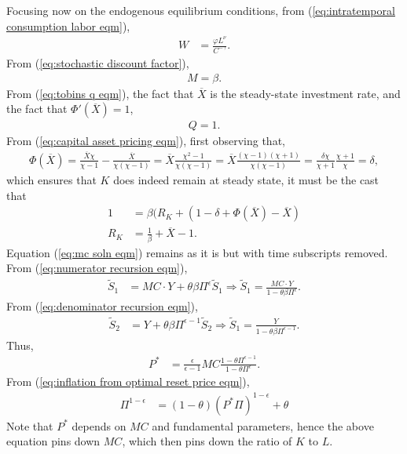 \documentclass[12 pt, oneside]{article}
\theoremstyle{definition}
\theoremstyle{definition}
\theoremstyle{definition}
\begin{document}
Focusing now on the endogenous equilibrium conditions, from (\ref{eq:intratemporal consumption labor eqm}),
\begin{align*}
  W & = \frac{\varphi L^\nu}{C^{-\gamma}}.
\end{align*}
From (\ref{eq:stochastic discount factor}),
\begin{align*}
  M = \beta.
\end{align*}
From (\ref{eq:tobins q eqm}), the fact that $\overline{X}$ is the steady-state investment rate, and the fact that $\Phi'(\overline{X}) = 1$,
\begin{align*}
  Q = 1.
\end{align*}
From (\ref{eq:capital asset pricing eqm}), first observing that,
\begin{align*}
  \Phi(\overline{X}) = \frac{\overline{X}\chi}{\chi - 1} - \frac{\overline{X}}{\chi (\chi - 1)} = \overline{X}\frac{\chi^2 - 1}{\chi(\chi - 1)} = \overline{X}\frac{(\chi - 1)(\chi + 1)}{\chi (\chi - 1)} = \frac{\delta\chi}{\chi + 1}\frac{\chi + 1}{\chi} = \delta,
\end{align*}
which ensures that $K$ does indeed remain at steady state, it must be the cast that
\begin{align*}
  1 & = \beta(R_K + (1 - \delta + \Phi(\overline{X}) - \overline{X})\\
  R_K & = \frac{1}{\beta} + \overline{X} - 1.
\end{align*}
Equation (\ref{eq:mc soln eqm}) remains as it is but with time subscripts removed. From (\ref{eq:numerator recursion eqm}),
\begin{align*}
  \tilde{S}_1 & = MC \cdot Y + \theta \beta \Pi^\epsilon \tilde{S}_1 \Rightarrow \tilde{S}_1 = \frac{MC\cdot Y}{1 - \theta\beta \Pi^\epsilon}.
\end{align*}
From (\ref{eq:denominator recursion eqm}),
\begin{align*}
  \tilde{S}_2 & = Y + \theta\beta \Pi^{\epsilon - 1}\tilde{S}_2 \Rightarrow \tilde{S}_1 = \frac{Y}{1 - \theta\beta \Pi^{\epsilon - 1}}.
\end{align*}
Thus,
\begin{align*}
  P^* & = \frac{\epsilon}{\epsilon - 1}MC \frac{1 - \theta \Pi^{\epsilon - 1}}{1 - \theta \Pi^{\epsilon}}.
\end{align*}
From (\ref{eq:inflation from optimal reset price eqm}),
\begin{align*}
  \Pi^{1 - \epsilon} & = ( 1- \theta) \left(P^* \Pi\right)^{1 - \epsilon} + \theta
\end{align*}
Note that $P^*$ depends on $MC$ and fundamental parameters, hence the above equation pins down $MC$, which then pins down the ratio of $K$ to $L$.
\end{document}
